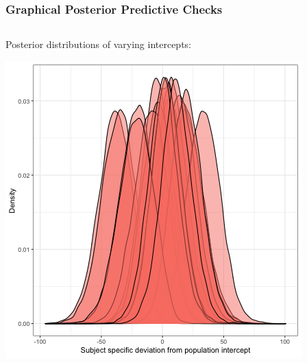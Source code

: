 \documentclass{beamer}
\newenvironment{VerbatimIN}
 {\VerbatimEnvironment
  \begin{tcolorbox}[
    breakable,
    colback=lightgray,
    spartan
  ]%
  \begin{Verbatim}}
 {\end{Verbatim}\end{tcolorbox}}
\begin{document}
\begin{frame}[fragile]
    \frametitle{Graphical Posterior Predictive Checks}
     \begin{columns}
        \begin{column}{0.5\textwidth}
            Posterior distributions of varying intercepts:
            \vspace{1.1cm}
            
            \includegraphics[width=\textwidth]{lectures/day_12_bayesian_lm_II/figures/unnamed-chunk-21-1.png}
        \end{column}
\end{columns}
\end{frame}
\end{document}
